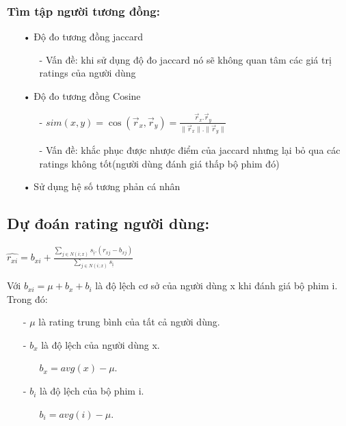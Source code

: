 \documentclass[a0,portrait,11pt]{a0poster}
\begin{document}
\begin{multicols}{2}
\begin{mybox}
\subsubsection*{Tìm tập người tương đồng:}
\begin{itemize}
\item[•] Độ đo tương đồng jaccard
\begin{itemize}
\item[-] Vấn đề: khi sử dụng độ đo jaccard nó sẽ không quan tâm các giá trị ratings của người dùng
\end{itemize}
\item[•] Độ đo tương đồng Cosine
\begin{itemize}
\item[-] $sim(x,y) = \cos(\vec{r}_x , \vec{r}_y) = \frac{\vec{r}_x.\vec{r}_y}{\parallel \vec{r}_x \parallel . \parallel \vec{r}_y \parallel}$
\item[-] Vấn đề: khắc phục được nhược điểm của jaccard nhưng lại bỏ qua các ratings không tốt(người dùng đánh giá thấp bộ phim đó)
\end{itemize}
\item[•] Sử dụng hệ số tương phản cá nhân
\end{itemize}
\subsection*{Dự đoán rating người dùng:}
\begin{center}
\Large{
$\hat{r_{xi}} = b_{xi} + \frac{\sum_{j\in N(i;x)}s_{ị}.(r_{xj} - b_{xj})}{\sum_{j\in N(i;x)}s_{ị} }$
}
\end{center}
Với $b_{xi} = \mu + b_x + b_i$ là độ lệch cơ sở của người dùng x khi đánh giá bộ phim i. Trong đó:
\begin{itemize}
\item[-] $\mu$ là rating trung bình của tất cả người dùng.
\item[-] $b_x$ là độ lệch của người dùng x.
\begin{itemize}
\item[] $b_x = avg(x) - \mu $.
\end{itemize}
\item[-] $b_i$ là độ lệch của bộ phim i.
\begin{itemize}
\item[] $b_i = avg(i) - \mu $.
\end{itemize}
\end{itemize}
\end{mybox}
\begin{mybox}

\end{mybox}
\end{multicols}
\end{document}
